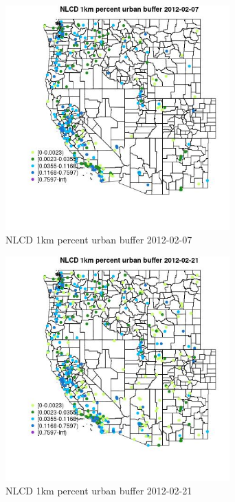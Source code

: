\begin{figure} 
\centering  
\includegraphics[width=0.77\textwidth]{Code_Outputs/Report_ML_input_PM25_Step4_part_f_de_duplicated_aves_prioritize_24hr_obswNAs_MapObsNLCD_1km_percent_urban_buffer2012-02-07.jpg} 
\caption{\label{fig:Report_ML_input_PM25_Step4_part_f_de_duplicated_aves_prioritize_24hr_obswNAsMapObsNLCD_1km_percent_urban_buffer2012-02-07}NLCD 1km percent urban buffer 2012-02-07} 
\end{figure} 
 

\clearpage 

\begin{figure} 
\centering  
\includegraphics[width=0.77\textwidth]{Code_Outputs/Report_ML_input_PM25_Step4_part_f_de_duplicated_aves_prioritize_24hr_obswNAs_MapObsNLCD_1km_percent_urban_buffer2012-02-21.jpg} 
\caption{\label{fig:Report_ML_input_PM25_Step4_part_f_de_duplicated_aves_prioritize_24hr_obswNAsMapObsNLCD_1km_percent_urban_buffer2012-02-21}NLCD 1km percent urban buffer 2012-02-21} 
\end{figure} 
 

